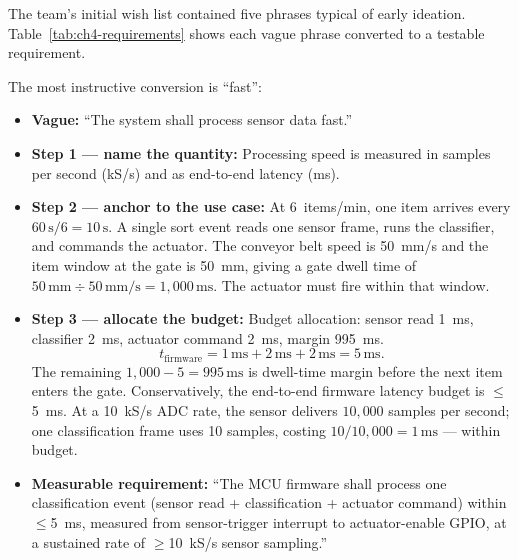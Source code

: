 The team's initial wish list contained five phrases typical of early ideation.
Table~\ref{tab:ch4-requirements} shows each vague phrase converted to a testable requirement.

The most instructive conversion is ``fast'':

\begin{itemize}
  \item \textbf{Vague:} ``The system shall process sensor data fast.''
  \item \textbf{Step 1 — name the quantity:} Processing speed is measured in samples per second (kS/s) and as end-to-end latency (ms).
  \item \textbf{Step 2 — anchor to the use case:} At 6~items/min, one item arrives every $60\,\text{s}/6 = 10\,\text{s}$.
        A single sort event reads one sensor frame, runs the classifier, and commands the actuator.
        The conveyor belt speed is 50~mm/s and the item window at the gate is 50~mm, giving a gate dwell time of $50\,\text{mm} \div 50\,\text{mm/s} = 1{,}000\,\text{ms}$.
        The actuator must fire within that window.
  \item \textbf{Step 3 — allocate the budget:}
        Budget allocation: sensor read 1~ms, classifier 2~ms, actuator command 2~ms, margin 995~ms.
        \begin{equation}
          \label{eq:ch4-budget-sum}
          t_{\text{firmware}} = 1\,\text{ms} + 2\,\text{ms} + 2\,\text{ms} = 5\,\text{ms}.
        \end{equation}
        The remaining $1{,}000 - 5 = 995\,\text{ms}$ is dwell-time margin before the next item enters the gate.
        Conservatively, the end-to-end firmware latency budget is $\leq$5~ms.
        At a 10~kS/s ADC rate, the sensor delivers $10{,}000$ samples per second; one classification frame uses 10 samples, costing $10/10{,}000 = 1\,\text{ms}$ — within budget.
  \item \textbf{Measurable requirement:} ``The MCU firmware shall process one classification event (sensor read + classification + actuator command) within $\leq$5~ms, measured from sensor-trigger interrupt to actuator-enable GPIO, at a sustained rate of $\geq$10~kS/s sensor sampling.''
\end{itemize}

